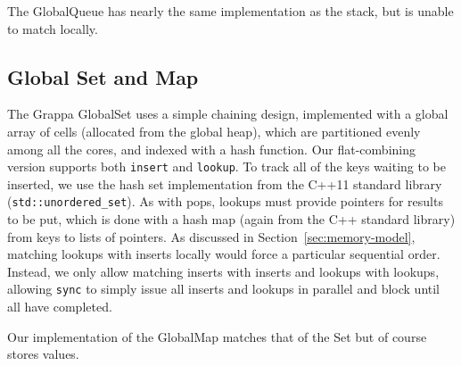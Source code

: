 The GlobalQueue has nearly the same implementation as the stack, but is unable to match locally.

\subsection{Global Set and Map}
The Grappa GlobalSet uses a simple chaining design, implemented with a global array of cells (allocated from the global heap), which are partitioned evenly among all the cores, and indexed with a hash function. Our flat-combining version supports both \texttt{insert} and \texttt{lookup}. To track all of the keys waiting to be inserted, we use the hash set implementation from the C++11 standard library (\texttt{std::unordered\_set}). As with pops, lookups must provide pointers for results to be put, which is done with a hash map (again from the C++ standard library) from keys to lists of pointers. As discussed in Section~\ref{sec:memory-model}, matching lookups with inserts locally would force a particular sequential order. Instead, we only allow matching inserts with inserts and lookups with lookups, allowing \texttt{sync} to simply issue all inserts and lookups in parallel and block until all have completed.

Our implementation of the GlobalMap matches that of the Set but of course stores values.

